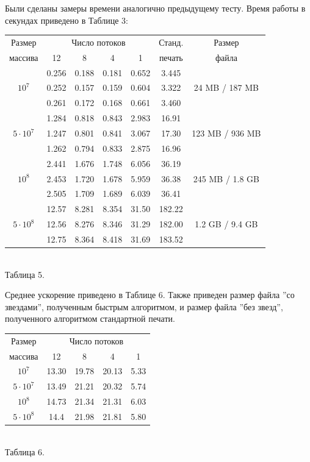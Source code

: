 Были сделаны замеры времени аналогично предыдущему тесту.
Время работы в секундах приведено в Таблице 3:
\begin{center}
\begin{tabular}{||c|c|c|c|c|c|c||}
\hline
\hline
Размер & \multicolumn{4}{c|}{Число потоков} & Станд. & Размер \\
\hhline{~|-|-|-|-|~|~|}
массива & 12 & 8 & 4 & 1 & печать  & файла\\
\hline
\hline
& 0.256 & 0.188 & 0.181 & 0.652 & 3.445  &\\
\hhline{~|-|-|-|-|-|}
$10^7$ & 0.252 & 0.157 & 0.159 & 0.604 & 3.322  & 24 MB / 187 MB \\
\hhline{~|-|-|-|-|-|}
& 0.261 & 0.172 & 0.168 & 0.661 & 3.460  &\\
\hline
& 1.284 & 0.818 & 0.843 & 2.983 & 16.91  &\\
\hhline{~|-|-|-|-|-|}
$5 \cdot 10^7$ & 1.247 & 0.801 & 0.841 & 3.067 & 17.30  & 123 MB / 936 MB\\
\hhline{~|-|-|-|-|-|}
& 1.262 & 0.794 & 0.833 & 2.875 & 16.96 & \\
\hline
& 2.441 & 1.676 & 1.748 & 6.056 & 36.19 &\\
\hhline{~|-|-|-|-|-|}
$10^8$ & 2.453 & 1.720 & 1.678 & 5.959 & 36.38  & 245 MB / 1.8 GB\\
\hhline{~|-|-|-|-|-|}
& 2.505 & 1.709 & 1.689 & 6.039 &  36.41  &\\
\hline
& 12.57 & 8.281 & 8.354 & 31.50 & 182.22  &\\
\hhline{~|-|-|-|-|-|}
$5 \cdot 10^8$ & 12.56 & 8.276 & 8.346 & 31.29 & 182.00  & 1.2 GB / 9.4 GB\\
\hhline{~|-|-|-|-|-|}
& 12.75  & 8.364 & 8.418 & 31.69 & 183.52  &\\
\hline
\hline
\end{tabular}
\\\vspace{10pt}
\small{Таблица 5.}
\end{center}
Среднее ускорение приведено в Таблице 6.
Также приведен размер файла ''со звездами'', полученным быстрым алгоритмом, и размер файла ''без звезд'', полученного алгоритмом стандартной печати.

\begin{center}
\begin{tabular}{||c|c|c|c|c||}
\hline
\hline
Размер & \multicolumn{4}{c|}{Число потоков}\\
\hhline{~|-|-|-|-|}
массива & 12 & 8 & 4 & 1 \\
\hline
$10^7$  & 13.30 & 19.78 & 20.13 & 5.33 \\
\hline
$5 \cdot 10^7$ & 13.49 & 21.21 & 20.32 & 5.74 \\
\hline
$10^8$ &14.73 & 21.34 & 21.31 & 6.03 \\
\hline
$5 \cdot 10^8$ &14.4 & 21.98 & 21.81 & 5.80 \\
\hline
\hline
\end{tabular}
\\\vspace{10pt}
\small{Таблица 6.}
\end{center}

